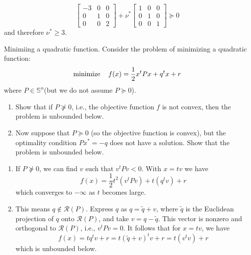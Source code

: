 \begin{problem}[5.29]
\begin{enumerate}
\[\begin{bmatrix}
            -3 & 0 & 0\\
            0 & 1 & 0\\
            0 & 0 & 2
        \end{bmatrix} + \nu^*\begin{bmatrix}
            1 & 0 & 0\\
            0 & 1 & 0\\
            0 & 0 & 1
        \end{bmatrix} \succeq 0\] and therefore $\nu^* \ge 3$.
    \end{enumerate}
\end{problem}

\begin{problem}[9.1]
    Minimiing a quadratic function. Consider the problem of minimizing a quadratic function:\[\operatorname{minimize} \quad f(x) = \frac{1}{2}x^tPx + q^tx + r\] where $P \in \mathbb{S}^n$(but we do not assume $P \succeq 0$).
    \begin{enumerate}
        \item Show that if $P \nsucceq 0$, i.e., the objective function $f$ is not convex, then the problem is unbounded below.
        \item Now suppose that $P \succeq 0$ (so the objective function is convex), but the optimality condition $Px^* = -q$ does not have a solution. Show that the problem is unbounded below.
    \end{enumerate}
    \Answer\text{}\begin{enumerate}
        \item If $P \nsucceq 0$, we can find $v$ such that $v^tPv < 0$. With $x = tv$ we have \[f(x) = \frac{1}{2}t^2(v^tPv) + t(q^tv) + r\] which converges to $-\infty$ as $t$ becomes large.
        \item This means $q \notin \mathcal{R}(P)$. Express $q$ as $q = \tilde{q} + v$, where $\tilde{q}$ is the Euclidean projection of $q$ onto $\mathcal{R}(P)$, and take $v = q - \tilde{q}$. This vector is nonzero and orthogonal to $\mathcal{R}(P)$, i.e., $v^tPv = 0$. It follows that for $x = tv$, we have \[f(x) = tq^tv + r = t(\tilde{q} + v)^tv + r = t(v^tv) + r\] which is unbounded below.
    \end{enumerate}
\end{problem}

